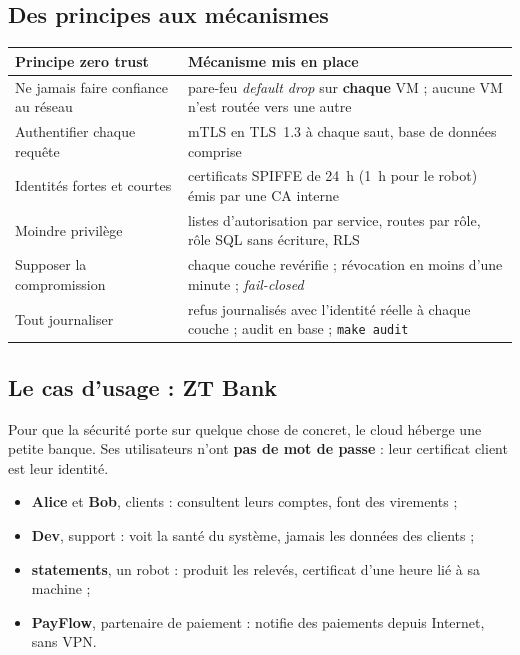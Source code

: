 \documentclass[11pt,a4paper]{article}
\newcommand{\cmd}[1]{\texttt{#1}}
\begin{document}
\subsection{Des principes aux mécanismes}
\begin{center}
\begin{tabularx}{\linewidth}{@{}p{4.6cm}L@{}}
\toprule
\textbf{Principe zero trust} & \textbf{Mécanisme mis en place}\\
\midrule
Ne jamais faire confiance au réseau & pare-feu \emph{default drop} sur \textbf{chaque} VM ; aucune VM n'est routée vers une autre\\
Authentifier chaque requête & mTLS en TLS~1.3 à chaque saut, base de données comprise\\
Identités fortes et courtes & certificats SPIFFE de 24~h (1~h pour le robot) émis par une CA interne\\
Moindre privilège & listes d'autorisation par service, routes par rôle, rôle SQL sans écriture, RLS\\
Supposer la compromission & chaque couche revérifie ; révocation en moins d'une minute ; \emph{fail-closed}\\
Tout journaliser & refus journalisés avec l'identité réelle à chaque couche ; audit en base ; \cmd{make audit}\\
\bottomrule
\end{tabularx}
\end{center}

\subsection{Le cas d'usage : ZT Bank}
Pour que la sécurité porte sur quelque chose de concret, le cloud héberge une petite banque.
Ses utilisateurs n'ont \textbf{pas de mot de passe} : leur certificat client est leur identité.
\begin{itemize}
  \item \textbf{Alice} et \textbf{Bob}, clients : consultent leurs comptes, font des virements ;
  \item \textbf{Dev}, support : voit la santé du système, jamais les données des clients ;
  \item \textbf{statements}, un robot : produit les relevés, certificat d'une heure lié à sa machine ;
  \item \textbf{PayFlow}, partenaire de paiement : notifie des paiements depuis Internet, sans VPN.
\end{itemize}
\end{document}
